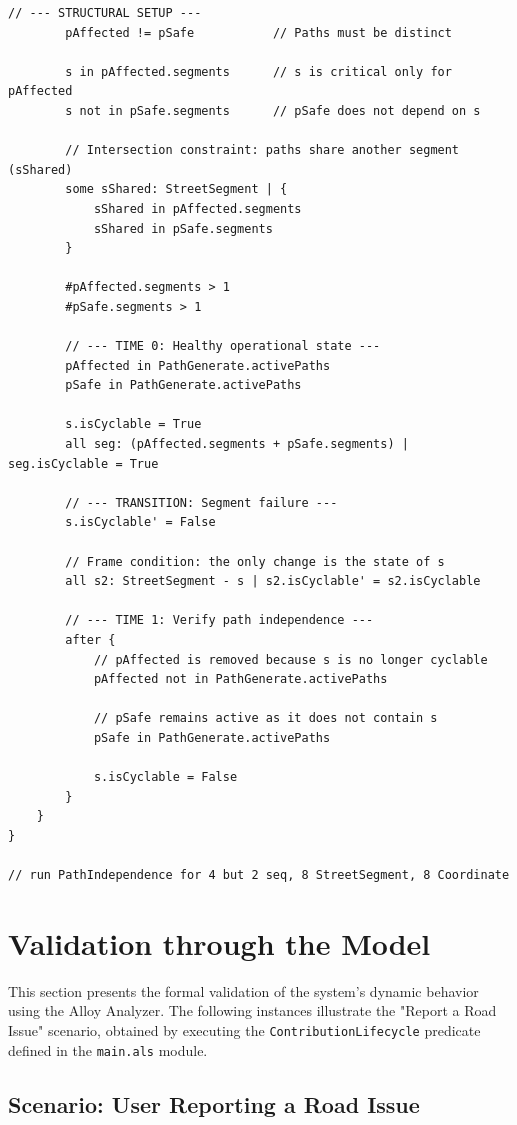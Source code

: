 \begin{lstlisting}[language=alloy, caption={Alloy Main Module for BBP}, label={lst:main}]
        // --- STRUCTURAL SETUP ---
        pAffected != pSafe           // Paths must be distinct
        
        s in pAffected.segments      // s is critical only for pAffected
        s not in pSafe.segments      // pSafe does not depend on s
        
        // Intersection constraint: paths share another segment (sShared)
        some sShared: StreetSegment | {
            sShared in pAffected.segments
            sShared in pSafe.segments
        }

        #pAffected.segments > 1      
        #pSafe.segments > 1
        
        // --- TIME 0: Healthy operational state ---
        pAffected in PathGenerate.activePaths
        pSafe in PathGenerate.activePaths
        
        s.isCyclable = True
        all seg: (pAffected.segments + pSafe.segments) | seg.isCyclable = True

        // --- TRANSITION: Segment failure ---
        s.isCyclable' = False

        // Frame condition: the only change is the state of s
        all s2: StreetSegment - s | s2.isCyclable' = s2.isCyclable

        // --- TIME 1: Verify path independence ---
        after {
            // pAffected is removed because s is no longer cyclable
            pAffected not in PathGenerate.activePaths
            
            // pSafe remains active as it does not contain s
            pSafe in PathGenerate.activePaths
            
            s.isCyclable = False
        }
    }
}

// run PathIndependence for 4 but 2 seq, 8 StreetSegment, 8 Coordinate
\end{lstlisting}

\section{Validation through the Model}
This section presents the formal validation of the system's dynamic behavior using the Alloy Analyzer. The following instances illustrate the "Report a Road Issue" scenario, obtained by executing the \texttt{ContributionLifecycle} predicate defined in the \texttt{main.als} module.

\subsection{Scenario: User Reporting a Road Issue}

